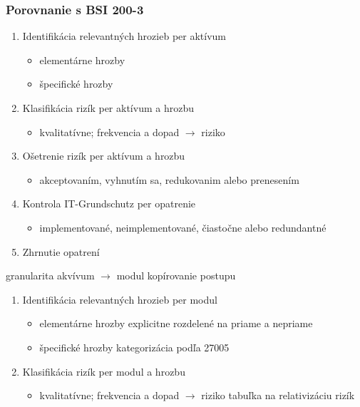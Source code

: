 \documentclass[11pt,xcolor={dvipsnames},hyperref={pdftex,pdfpagemode=UseNone,hidelinks,pdfdisplaydoctitle=true},usepdftitle=false]{beamer}
\begin{document}
\begin{frame}[allowframebreaks]
	\frametitle{Porovnanie s BSI 200-3}
	\begin{enumerate}
		\item Identifikácia relevantných hrozieb per aktívum
			\begin{itemize}
				\item elementárne hrozby
				\item špecifické hrozby
			\end{itemize}
		\item Klasifikácia rizík per aktívum a hrozbu
			\begin{itemize}
				\item kvalitatívne; frekvencia a dopad $\rightarrow$ riziko
			\end{itemize}
		\item Ošetrenie rizík per aktívum a hrozbu
			\begin{itemize}
				\item akceptovaním, vyhnutím sa, redukovanim alebo prenesením
			\end{itemize}
		\item Kontrola IT-Grundschutz per opatrenie
			\begin{itemize}
				\item implementované, neimplementované, čiastočne alebo redundantné
			\end{itemize}
		\item Zhrnutie opatrení
	\end{enumerate}
	\pagebreak
	\begin{enumerate}
		 \pro granularita akvívum $\rightarrow$ modul
		 \pro kopírovanie postupu
	\end{enumerate}
	\begin{enumerate}
		\item Identifikácia relevantných hrozieb per \textcolor{PineGreen}{modul}
			\begin{itemize}
				\item elementárne hrozby \textcolor{PineGreen}{explicitne rozdelené na priame a nepriame}
				\item špecifické hrozby
				\pro kategorizácia podľa 27005
			\end{itemize}
		\item Klasifikácia rizík per \textcolor{PineGreen}{modul} a hrozbu
			\begin{itemize}
				\item kvalitatívne; frekvencia a dopad $\rightarrow$ riziko
				\pro tabuľka na relativizáciu rizík

\end{itemize}
\end{enumerate}
\end{frame}
\end{document}
